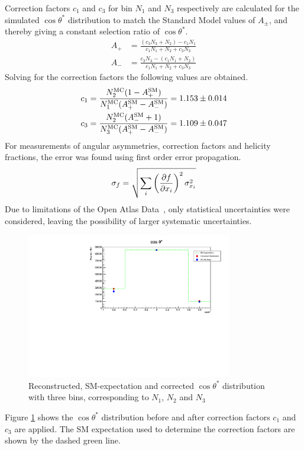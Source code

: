 \documentclass[12pt,a4paper]{article}
\numberwithin{equation}{section}
\begin{document}
Correction factors $c_1$ and $c_3$ for bin $N_1$ and $N_3$ respectively are
calculated for the simulated $\cos\theta^*$ distribution to match the Standard Model
values of $A_{\pm}$, and thereby giving a constant selection ratio of $\cos\theta^*$.
\newcommand{\MC}{\mathrm{MC}}
\newcommand{\SM}{\mathrm{SM}}
\begin{align}
	A_{+} &= \frac{(c_3N_3 + N_2) - c_1N_1}{c_1N_1 + N_2 + c_3N_3} \\
	A_{-} &= \frac{c_3N_3 - (c_1N_1 + N_2)}{c_1N_1 + N_2 + c_3N_3}
\end{align}
Solving for the correction factors the following values are obtained.
\begin{align} \label{eq:correction}
	c_1 &= \frac{N_2^{\MC}(1-A_{+}^{\SM})}{N_1^{\MC}(A_{+}^{\SM} -A_{-}^{\SM})} = \num{1.153 +- 0.014}  \\
	c_3 &= \frac{N_2^{\MC}(A_{-}^{\SM}+1)}{N_3^{\MC}(A_{+}^{\SM}-A_{-}^{\SM})} = \num{1.109 +- 0.047}
\end{align}
For measurements of angular asymmetries, correction factors and helicity
fractions, the error was found using first order error propagation.
\begin{align}
	\sigma_{f} = \sqrt{\sum_{i}\left(\pdv{f}{x_i}\right)^2\sigma_{x_i}^2}
\end{align}
Due to limitations of the Open Atlas Data~\cite{oreach2020}, only statistical
uncertainties were considered, leaving the possibility of larger systematic
uncertainties.\\

\begin{figure}[H]
	\centering
	\includegraphics[width=0.8\textwidth]{figures/nhist.pdf}
	\caption{Reconstructed, SM-expectation and corrected $\cos\theta^{*}$ distribution with three bins, corresponding to $N_1$, $N_2$ and $N_3$}
	\label{fig:cos3bin}
\end{figure}
Figure \ref{fig:cos3bin} shows the $\cos\theta^{*}$ distribution before and after correction factors $c_1$ and $c_3$ are applied. The SM expectation used to determine the correction factors are shown by the dashed green line. \\
\end{document}
